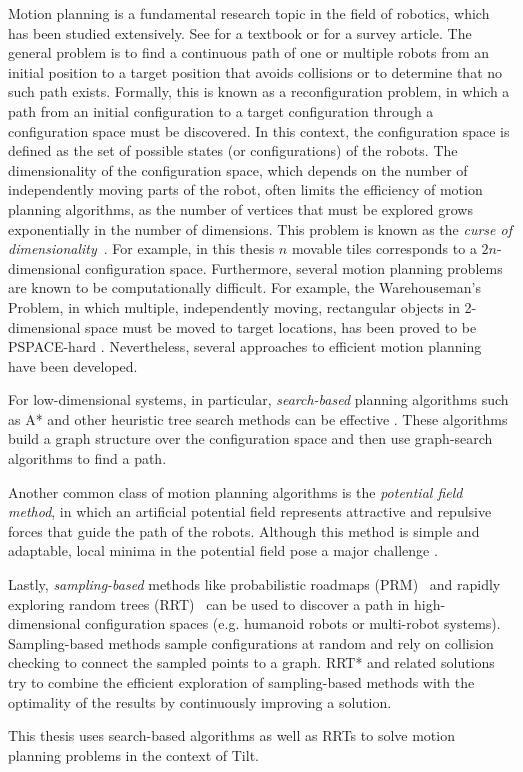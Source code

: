 Motion planning is a fundamental research topic in the field of robotics, which has been studied extensively. See \cite{LaValle2006} for a textbook or \cite{Yang2019} for a survey article. The general problem is to find a continuous path of one or multiple robots from an initial position to a target position that avoids collisions or to determine that no such path exists. Formally, this is known as a reconfiguration problem, in which a path from an initial configuration to a target configuration through a configuration space must be discovered. In this context, the configuration space is defined as the set of possible states (or configurations) of the robots. The dimensionality of the configuration space, which depends on the number of independently moving parts of the robot, often limits the efficiency of motion planning algorithms, as the number of vertices that must be explored grows exponentially in the number of dimensions. This problem is known as the \emph{curse of dimensionality}~\cite{Petrovic2018}. For example, in this thesis $n$ movable tiles corresponds to a $2n$-dimensional configuration space.
Furthermore, several motion planning problems are known to be computationally difficult. For example, the Warehouseman's Problem, in which multiple, independently moving, rectangular objects in 2-dimensional space must be moved to target locations, has been proved to be PSPACE-hard \cite{Hopcroft1984}. Nevertheless, several approaches to efficient motion planning have been developed. \par
For low-dimensional systems, in particular, \emph{search-based} planning algorithms such as A* and other heuristic tree search methods can be effective \cite{Bonet2001}. These algorithms build a graph structure over the configuration space and then use graph-search algorithms to find a path. \par
Another common class of motion planning algorithms is the \emph{potential field method}, in which an artificial potential field represents attractive and repulsive forces that guide the path of the robots. Although this method is simple and adaptable, local minima in the potential field pose a major challenge \cite{Yun1997}. \par
Lastly, \emph{sampling-based} methods like probabilistic roadmaps (PRM)~\cite{Kavraki1996} and rapidly exploring random trees (RRT)~\cite{Lavalle1998} can be used to discover a path in high-dimensional configuration spaces (e.g. humanoid robots or multi-robot systems). Sampling-based methods sample configurations at random and rely on collision checking to connect the sampled points to a graph. RRT* and related solutions try to combine the efficient exploration of sampling-based methods with the optimality of the results by continuously improving a solution. \par
This thesis uses search-based algorithms as well as RRTs to solve motion planning problems in the context of Tilt.\par

